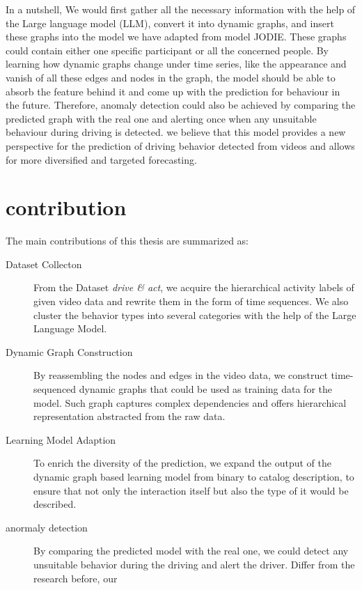 In a nutshell, We would first gather all the necessary information with the help of the Large language model (LLM), convert it into dynamic graphs, and insert these graphs into the model we have adapted from model JODIE. These graphs could contain either one specific participant or all the concerned people. By learning how dynamic graphs change under time series, like the appearance and vanish of all these edges and nodes in the graph, the model should be able to absorb the feature behind it and come up with the prediction for behaviour in the future. Therefore, anomaly detection could also be achieved by comparing the predicted graph with the real one and alerting once when any unsuitable behaviour during driving is detected. we believe that this model provides a new perspective for the prediction of driving behavior detected from videos and allows for more diversified and targeted forecasting.


\section{contribution}
The main contributions of this thesis are summarized as:
\begin{description}
    \item[Dataset Collecton] From the Dataset \textit{drive \& act}, we acquire the hierarchical activity labels of given video data and rewrite them in the form of time sequences. We also cluster the behavior types into several categories with the help of the Large Language Model.
    \item[Dynamic Graph Construction] By reassembling the nodes and edges in the video data, we construct time-sequenced dynamic graphs that could be used as training data for the model. Such graph captures complex dependencies and offers hierarchical representation abstracted from the raw data.
    \item[Learning Model Adaption] To enrich the diversity of the prediction, we expand the output of the dynamic graph based learning model from binary to catalog description, to ensure that not only the interaction itself but also the type of it would be described.
    \item[anormaly detection] By comparing the predicted model with the real one, we could detect any unsuitable behavior during the driving and alert the driver. Differ from the research before, our 
\end{description}
    
    



